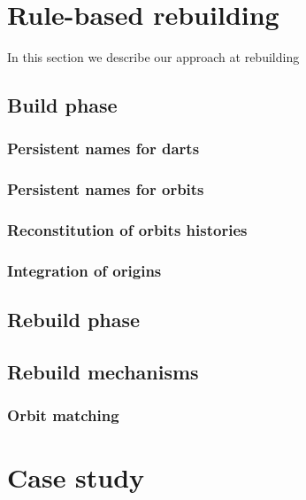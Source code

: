 \documentclass[authoryear,preprint,review,12pt,x11names]{elsarticle}
\begin{document}


\section{Rule-based rebuilding}%
\label{sec:rule-based-rebu}

In this section we describe our approach at rebuilding


\subsection{Build phase}%
\label{sec:build-phase}

\subsubsection{Persistent names for darts}%
\label{sec:pers-names-darts}

\subsubsection{Persistent names for orbits}%
\label{sec:pers-names-orbits}

\subsubsection{Reconstitution of orbits histories}%
\label{sec:reconst-orbits-hist}

\subsubsection{Integration of origins}%
\label{sec:integration-origins}

\subsection{Rebuild phase}%
\label{sec:rebuild-phase}

\subsection{Rebuild mechanisms}%
\label{sec:rebuild-mechanisms}

\subsubsection{Orbit matching}%
\label{sec:orbit-matching}

\section{Case study}%
\label{sec:case-study}







\end{document}
